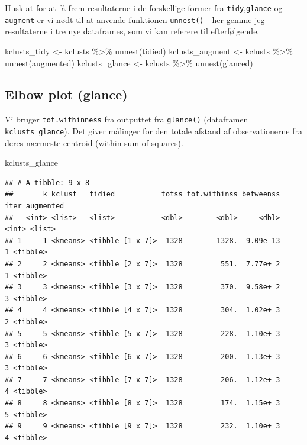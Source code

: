 \documentclass[
]{book}
\newenvironment{Shaded}{\begin{snugshade}}{\end{snugshade}}
\newcommand{\FunctionTok}[1]{\textcolor[rgb]{0.00,0.00,0.00}{#1}}
\newcommand{\NormalTok}[1]{#1}
\newcommand{\OtherTok}[1]{\textcolor[rgb]{0.56,0.35,0.01}{#1}}
\newcommand{\SpecialCharTok}[1]{\textcolor[rgb]{0.00,0.00,0.00}{#1}}
\begin{document}
Husk at for at få frem resultaterne i de forskellige former fra \texttt{tidy},\texttt{glance} og \texttt{augment} er vi nødt til at anvende funktionen \texttt{unnest()} - her gemme jeg resultaterne i tre nye dataframes, som vi kan referere til efterfølgende.

\begin{Shaded}
\begin{Highlighting}[]
\NormalTok{kclusts\_tidy    }\OtherTok{\textless{}{-}}\NormalTok{ kclusts }\SpecialCharTok{\%\textgreater{}\%} \FunctionTok{unnest}\NormalTok{(tidied)}
\NormalTok{kclusts\_augment }\OtherTok{\textless{}{-}}\NormalTok{ kclusts }\SpecialCharTok{\%\textgreater{}\%} \FunctionTok{unnest}\NormalTok{(augmented)}
\NormalTok{kclusts\_glance }\OtherTok{\textless{}{-}}\NormalTok{ kclusts }\SpecialCharTok{\%\textgreater{}\%} \FunctionTok{unnest}\NormalTok{(glanced)}
\end{Highlighting}
\end{Shaded}

\hypertarget{elbow-plot-glance}{%
\subsection{Elbow plot (glance)}\label{elbow-plot-glance}}

Vi bruger \texttt{tot.withinness} fra outputtet fra \texttt{glance()} (dataframen \texttt{kclusts\_glance}). Det giver målinger for den totale afstand af observationerne fra deres nærmeste centroid (within sum of squares).

\begin{Shaded}
\begin{Highlighting}[]
\NormalTok{kclusts\_glance}
\end{Highlighting}
\end{Shaded}

\begin{verbatim}
## # A tibble: 9 x 8
##       k kclust   tidied           totss tot.withinss betweenss  iter augmented
##   <int> <list>   <list>           <dbl>        <dbl>     <dbl> <int> <list>   
## 1     1 <kmeans> <tibble [1 x 7]>  1328        1328.  9.09e-13     1 <tibble> 
## 2     2 <kmeans> <tibble [2 x 7]>  1328         551.  7.77e+ 2     1 <tibble> 
## 3     3 <kmeans> <tibble [3 x 7]>  1328         370.  9.58e+ 2     3 <tibble> 
## 4     4 <kmeans> <tibble [4 x 7]>  1328         304.  1.02e+ 3     2 <tibble> 
## 5     5 <kmeans> <tibble [5 x 7]>  1328         228.  1.10e+ 3     3 <tibble> 
## 6     6 <kmeans> <tibble [6 x 7]>  1328         200.  1.13e+ 3     3 <tibble> 
## 7     7 <kmeans> <tibble [7 x 7]>  1328         206.  1.12e+ 3     4 <tibble> 
## 8     8 <kmeans> <tibble [8 x 7]>  1328         174.  1.15e+ 3     5 <tibble> 
## 9     9 <kmeans> <tibble [9 x 7]>  1328         232.  1.10e+ 3     4 <tibble>
\end{verbatim}
\end{document}
